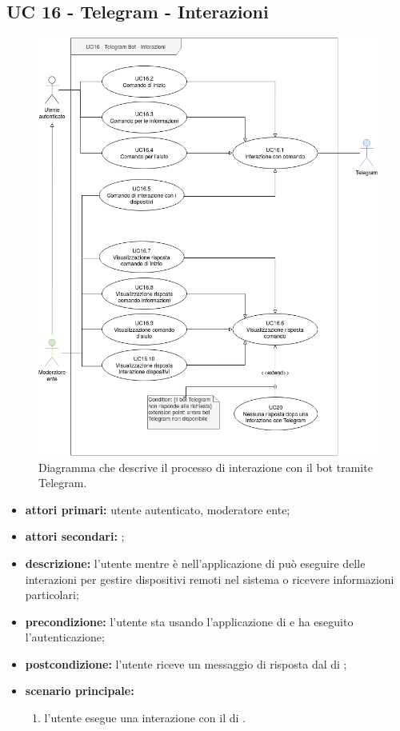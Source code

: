 \subsection{UC 16 - Telegram - Interazioni}

	\begin{figure}[H]
		\centering
		\includegraphics[scale=0.60]{res/images/uc16}
		\caption{Diagramma che descrive il processo di interazione con il bot tramite Telegram.}
	\end{figure}

	\begin{itemize}
		\item \textbf{attori primari:} utente autenticato, moderatore ente;
		\item \textbf{attori secondari:} ;
		\item \textbf{descrizione:} l'utente mentre è nell'applicazione di  può eseguire delle interazioni per gestire dispositivi remoti nel sistema o ricevere informazioni particolari;
		\item \textbf{precondizione:} l'utente sta usando l'applicazione di  e ha eseguito l'autenticazione;
		\item \textbf{postcondizione:} l'utente riceve un messaggio di risposta dal  di ;
		\item \textbf{scenario principale:}
		\begin{enumerate}
			\item l'utente esegue una interazione con il  di .
		\end{enumerate}
	\end{itemize}

